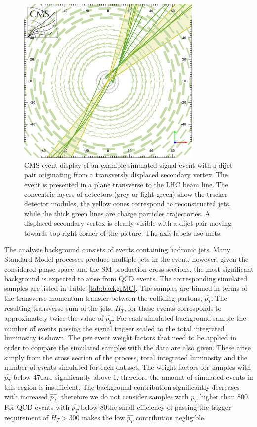 \begin{figure}[htbp]
\centering
 \includegraphics[width=0.8\textwidth]{plots/eventDisplay.png}
\caption{CMS event display of an example simulated signal event with a dijet pair originating from a transversly displaced secondary vertex.
The event is presented in a plane transverse to the LHC beam line.
The concentric layers of detectors (grey or light green) show the tracker detector modules, the
yellow cones correspond to reconstructed jets, while the thick green lines are charge particles
trajectories. A displaced secondary vertex is clearly visible with a dijet pair moving towards
top-right corner of the picture.
The axis labels use \cm units. \label{fig:eventDisplay}}
\end{figure}


The analysis background consists of events containing hadronic jets. Many Standard Model processes
produce multiple jets in the event, however, given the considered phase space and the SM production
cross sections,
 the most significant background 
is expected to arise from QCD events. The corresponding simulated samples
are listed in Table~\ref{tab:backgrMC}. The samples are binned in terms
of the transverse momentum transfer between the colliding partons, $\hat{p_T}$.
The resulting transverse sum
of the jets, $H_T$, for these events corresponds to approximately twice the value of $\hat{p_T}$. 
For each simulated background sample the number of events passing the signal trigger
scaled to the total integrated luminosity is shown. The per event weight factors that need 
to be applied in order to compare the simulated samples with the data are also given. These
arise simply from the cross section of the process, total integrated luminosity and the number
of events simulated for each dataset.
The weight factors for samples with $\hat{p_T}$
below 470\GeV are significantly above 1, therefore the amount of simulated events in this region is insufficient.
The background contribution
significantly decreases with increased $\hat{p_T}$, therefore we do not consider samples with $\hat{p_T}$ higher
than 800\GeV. For QCD events with $\hat{p_T}$ below 80\GeV the small efficiency of passing the trigger
 requirement of $H_T>$300\GeV
makes the low $\hat{p_T}$ contribution negligible.

